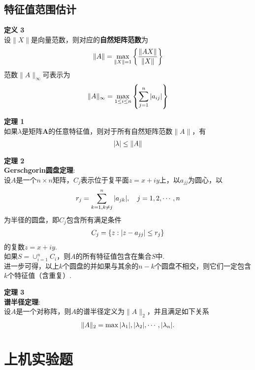\documentclass[UTF8]{ctexart}
\newenvironment{dingyi}[2][定义]
{\begin{mdframed}[backgroundcolor=gray!20] \textbf{#1 #2} \\}
	{\end{mdframed}}
\newenvironment{dingli}[2][定理]
{\begin{mdframed}[backgroundcolor=gray!20] \textbf{#1 #2} \\}
	{\end{mdframed}}
\begin{document}
\subsection{特征值范围估计}
\begin{dingyi}{3}
	设$\|X\|$是向量范数，则对应的\textbf{自然矩阵范数}为
	\begin{align}
		\|A\|=\max _{\|X\|=1}\left\{\frac{\|A X\|}{\|X\|}\right\} \notag
	\end{align}
	范数$\|A\|_{\infty}$可表示为
	\begin{align}
		\|A\|_{\infty}=\max _{1\leq i\leq n}\left\{\sum_{j=1}^{n}|a_{ij}|\right\} \notag
	\end{align}
\end{dingyi}
\begin{dingli}{1}
	如果$\lambda$是矩阵$\mathbf{A}$的任意特征值，则对于所有自然矩阵范数$\|A\|$，有
	\begin{align}
		|\lambda| \leq \|A\| \notag
	\end{align}
\end{dingli}
\begin{dingli}{2}
	\textbf{Gerschgorin圆盘定理}:\\
	设$A$是一个$n\times n$矩阵，$C_j$表示位于复平面$z=x+iy$上，以$a_{jj}$为圆心，以
	\begin{align}
		r_j = \sum_{k=1,k\neq j}^{n} |a_{jk}|, \quad j=1,2,\cdots,n \notag
	\end{align}
	为半径的圆盘，即$C_j$包含所有满足条件
	\begin{align}
			C_j = \{z:|z-a_{jj}|\leq r_j\} \notag
	\end{align}
	的复数$z=x+iy$.\\
	如果$S=\cup^{n}_{i=1} C_i$，则$A$的所有特征值包含在集合$S$中.\\
	进一步可得，以上$k$个圆盘的并如果与其余的$n-k$个圆盘不相交，则它们一定包含$k$个特征值（含重复）.
\end{dingli}
\begin{dingli}{3}
	\textbf{谱半径定理}:\\
	设$A$是一个对称阵，则$A$的谱半径定义为$\|A\|_{2}$，并且满足如下关系
	\begin{align}
		\|A\|_{2} = \max{|\lambda_1|, |\lambda_2|, \cdots, |\lambda_n|}. \notag
	\end{align}
\end{dingli}
\section{上机实验题}
\end{document}
